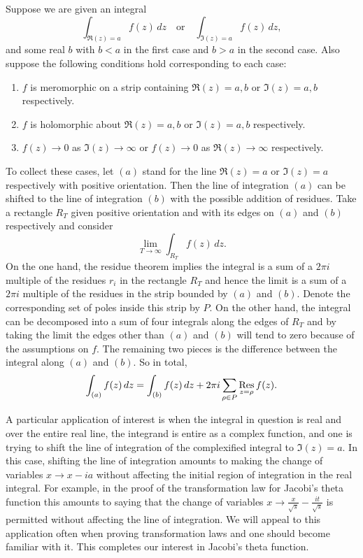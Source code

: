       \begin{method}
        Suppose we are given an integral
        \[
          \int_{\Re(z) = a}f(z)\,dz \quad \text{or} \quad \int_{\Im(z) = a}f(z)\,dz,
        \]
        and some real $b$ with $b < a$ in the first case and $b > a$ in the second case. Also suppose the following conditions hold corresponding to each case:
        \begin{enumerate}[label=(\roman*)]
          \item $f$ is meromorphic on a strip containing $\Re(z) = a,b$ or $\Im(z) = a,b$ respectively.
          \item $f$ is holomorphic about $\Re(z) = a,b$ or $\Im(z) = a,b$ respectively.
          \item $f(z) \to 0$ as $\Im(z) \to \infty$ or $f(z) \to 0$ as $\Re(z) \to \infty$ respectively.
        \end{enumerate}
        To collect these cases, let $(a)$ stand for the line $\Re(z) = a$ or $\Im(z) = a$ respectively with positive orientation. Then the line of integration $(a)$ can be shifted to the line of integration $(b)$ with the possible addition of residues. Take a rectangle $R_{T}$ given positive orientation and with its edges on $(a)$ and $(b)$ respectively and consider
        \[
          \lim_{T \to \infty}\int_{R_{T}}f(z)\,dz.
        \]
        On the one hand, the residue theorem implies the integral is a sum of a $2\pi i$ multiple of the residues $r_{i}$ in the rectangle $R_{T}$ and hence the limit is a sum of a $2\pi i$ multiple of the residues in the strip bounded by $(a)$ and $(b)$. Denote the corresponding set of poles inside this strip by $P$. On the other hand, the integral can be decomposed into a sum of four integrals along the edges of $R_{T}$ and by taking the limit the edges other than $(a)$ and $(b)$ will tend to zero because of the assumptions on $f$. The remaining two pieces is the difference between the integral along $(a)$ and $(b)$. So in total,
        \[
          \int_{(a)}f(z)\,dz = \int_{(b)}f(z)\,dz+2\pi i\sum_{\rho \in P}\operatorname*{\mathrm{Res}}_{z = \rho}f(z).
        \]
      \end{method}

      A particular application of interest is when the integral in question is real and over the entire real line, the integrand is entire as a complex function, and one is trying to shift the line of integration of the complexified integral to $\Im(z) = a$. In this case, shifting the line of integration amounts to making the change of variables $x \to x-ia$ without affecting the initial region of integration in the real integral. For example, in the proof of the transformation law for Jacobi's theta function this amounts to saying that the change of variables $x \to \frac{x}{\sqrt{s}}-\frac{it}{\sqrt{s}}$ is permitted without affecting the line of integration. We will appeal to this application often when proving transformation laws and one should become familiar with it. This completes our interest in Jacobi's theta function.

